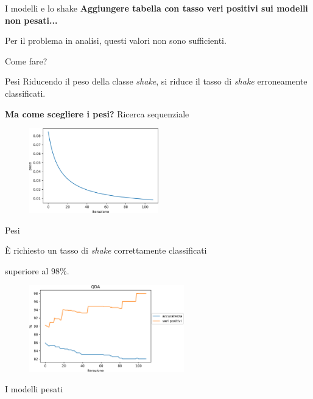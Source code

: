 \documentclass{beamer}
\begin{document}
\begin{frame}{I modelli e lo shake}
\textbf{Aggiungere tabella con tasso veri positivi sui modelli non pesati...}

Per il problema in analisi, questi valori non sono sufficienti. 

Come fare?
\end{frame}

\begin{frame}{Pesi}
Riducendo il peso della classe {\em shake}, si riduce il tasso di {\em shake} erroneamente classificati.

\textbf{Ma come scegliere i pesi?} \pause Ricerca sequenziale
\begin{figure}[H]
\includegraphics[width=0.5\textwidth]{../figure/andamento-pesi.png}
\end{figure}

\end{frame}

\begin{frame}{Pesi}
\begin{center}
È richiesto un tasso di {\em shake} correttamente classificati 

superiore al $98\%$.
\end{center}
\begin{figure}[H]
\includegraphics[width=0.6\textwidth]{../figure/acc-vs-veripos-qda.png}  
\end{figure}

\end{frame}

\begin{frame}{I modelli pesati}

\end{frame}
\end{document}
